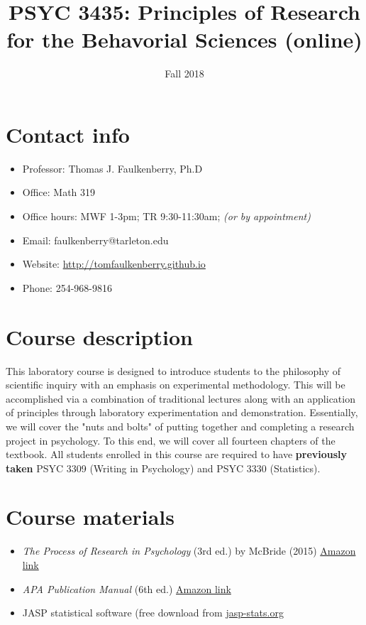\documentclass[10pt]{article}
\date{Fall 2018}
\title{PSYC 3435: Principles of Research for the Behavorial Sciences (online)}
\begin{document}
\maketitle

\section*{Contact info}
\label{sec-1}
\begin{itemize}
\item Professor: Thomas J. Faulkenberry, Ph.D
\item Office: Math 319
\item Office hours: MWF 1-3pm; TR 9:30-11:30am; \emph{(or by appointment)}
\item Email: faulkenberry@tarleton.edu
\item Website: \url{http://tomfaulkenberry.github.io}
\item Phone: 254-968-9816
\end{itemize}

\section*{Course description}
\label{sec-2}

This laboratory course is designed to introduce students to the philosophy of 
scientific inquiry with an emphasis on experimental methodology. This will be 
accomplished via a combination of traditional lectures along with an application 
of principles through laboratory experimentation and demonstration. Essentially, 
we will cover the "nuts and bolts" of putting together and completing a research 
project in psychology. To this end, we will cover all fourteen chapters of the 
textbook. All students enrolled in this course are required to have 
\textbf{previously taken} PSYC 3309 (Writing in Psychology) and PSYC 3330 (Statistics). 

\section*{Course materials}
\label{sec-3}

\begin{itemize}
\item \emph{The Process of Research in Psychology} (3rd ed.) by McBride (2015) \href{https://www.amazon.com/Process-Research-Psychology-Dawn-McBride/dp/1483347605/}{Amazon link}
\item \emph{APA Publication Manual} (6th ed.) \href{http://www.amazon.com/Publication-Manual-American-Psychological-Association/dp/1433805618/}{Amazon link}
\item JASP statistical software (free download from \href{http://jasp-stats.org}{jasp-stats.org}
\end{itemize}
\end{document}
